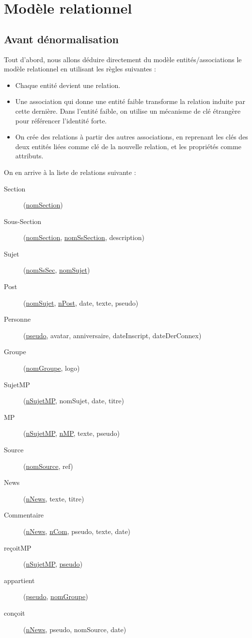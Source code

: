 \section{Modèle relationnel}
\subsection{Avant dénormalisation}
Tout d'abord, nous allons déduire directement du modèle entités/associations le modèle relationnel en utilisant les règles suivantes :
\begin{itemize}
	\item Chaque entité devient une relation.
	\item Une association qui donne une entité faible transforme la relation induite par cette dernière. Dans l'entité faible, on utilise un mécanisme de clé étrangère pour référencer l'identité forte.
	\item On crée des relations à partir des autres associations, en reprenant les clés des deux entités liées comme clé de la nouvelle relation, et les propriétés comme attributs. 
\end{itemize}

\bigskip
On en arrive à la liste de relations suivante :

\begin{description}
	\item[Section] (\underline{nomSection})
	\item[Sous-Section] (\underline{nomSection}, \underline{nomSsSection}, description)
	\item[Sujet] (\underline{nomSsSec}, \underline{nomSujet})
	\item[Post] (\underline{nomSujet}, \underline{n\degree Post}, date, texte, pseudo)
	\item[Personne] (\underline{pseudo}, avatar, anniversaire, dateInscript, dateDerConnex)
	\item[Groupe] (\underline{nomGroupe}, logo)
	\item[SujetMP] (\underline{n\degree SujetMP}, nomSujet, date, titre)
	\item[MP] (\underline{n\degree SujetMP}, \underline{n\degree MP}, texte, pseudo)
	\item[Source] (\underline{nomSource}, ref)
	\item[News] (\underline{n\degree News}, texte, titre)
	\item[Commentaire] (\underline{n\degree News}, \underline{n\degree Com}, pseudo, texte, date)
	\item[reçoitMP] (\underline{n\degree SujetMP}, \underline{pseudo})
	\item[appartient] (\underline{pseudo}, \underline{nomGroupe})
	\item[conçoit] (\underline{n\degree News}, pseudo, nomSource, date)
\end{description}

